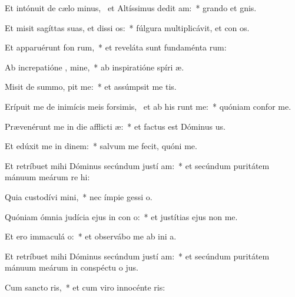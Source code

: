 \item Et intónuit de cælo minus,~\pscross{} et Altíssimus dedit  am:~* grando et  gnis.
\item Et misit sagíttas suas, et dissi os:~* fúlgura multiplicávit, et con os.
\item Et apparuérunt fon rum,~* et reveláta sunt fundaménta  rum:
\item Ab increpatióne , mine,~* ab inspiratióne spíri  æ.
\item Misit de summo,  pit me:~* et assúmpsit me   tis.
\item Erípuit me de inimícis meis forsimis,~\pscross{} et ab his  runt me:~* quóniam confor   me.
\item Prævenérunt me in die afflicti æ:~* et factus est Dóminus  us.
\item Et edúxit me in dinem:~* salvum me fecit, quóni  me.
\item Et retríbuet mihi Dóminus secúndum justí am:~* et secúndum puritátem mánuum meárum re hi:
\item Quia custodívi  mini,~* nec ímpie gessi   o.
\item Quóniam ómnia judícia ejus in con o:~* et justítias ejus non   me.
\item Et ero immaculá  o:~* et observábo me ab ini a.
\item Et retríbuet mihi Dóminus secúndum justí am:~* et secúndum puritátem mánuum meárum in conspéctu o jus.
\item Cum sancto  ris,~* et cum viro innocénte  ris:
